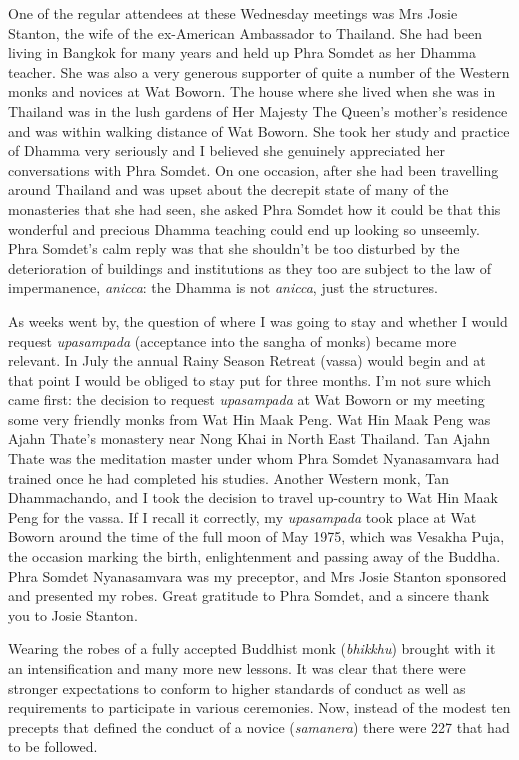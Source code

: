 One of the regular attendees at these Wednesday meetings was Mrs Josie
Stanton, the wife of the ex-American Ambassador to Thailand. She had
been living in Bangkok for many years and held up Phra Somdet as her
Dhamma teacher. She was also a very generous supporter of quite a number
of the Western monks and novices at Wat Boworn. The house where she
lived when she was in Thailand was in the lush gardens of Her Majesty
The Queen's mother's residence and was within walking distance of Wat
Boworn. She took her study and practice of Dhamma very seriously and I
believed she genuinely appreciated her conversations with Phra Somdet.
On one occasion, after she had been travelling around Thailand and was
upset about the decrepit state of many of the monasteries that she had
seen, she asked Phra Somdet how it could be that this wonderful and
precious Dhamma teaching could end up looking so unseemly. Phra Somdet's
calm reply was that she shouldn't be too disturbed by the deterioration
of buildings and institutions as they too are subject to the law of
impermanence, \emph{anicca}: the Dhamma is not \emph{anicca}, just the
structures.

As weeks went by, the question of where I was going to stay and whether
I would request \emph{upasampada} (acceptance into the sangha of monks)
became more relevant. In July the annual Rainy Season Retreat (vassa)
would begin and at that point I would be obliged to stay put for three
months. I'm not sure which came first: the decision to request
\emph{upasampada} at Wat Boworn or my meeting some very friendly monks
from Wat Hin Maak Peng. Wat Hin Maak Peng was Ajahn Thate's monastery
near Nong Khai in North East Thailand. Tan Ajahn Thate was the
meditation master under whom Phra Somdet Nyanasamvara had trained once
he had completed his studies. Another Western monk, Tan Dhammachando,
and I took the decision to travel up-country to Wat Hin Maak Peng for
the vassa. If I recall it correctly, my \emph{upasampada} took place at
Wat Boworn around the time of the full moon of May 1975, which was
Vesakha Puja, the occasion marking the birth, enlightenment and passing
away of the Buddha. Phra Somdet Nyanasamvara was my preceptor, and Mrs
Josie Stanton sponsored and presented my robes. Great gratitude to Phra
Somdet, and a sincere thank you to Josie Stanton.

Wearing the robes of a fully accepted Buddhist monk (\emph{bhikkhu})
brought with it an intensification and many more new lessons. It was
clear that there were stronger expectations to conform to higher
standards of conduct as well as requirements to participate in various
ceremonies. Now, instead of the modest ten precepts that defined the
conduct of a novice (\emph{samanera}) there were 227 that had to be
followed.

